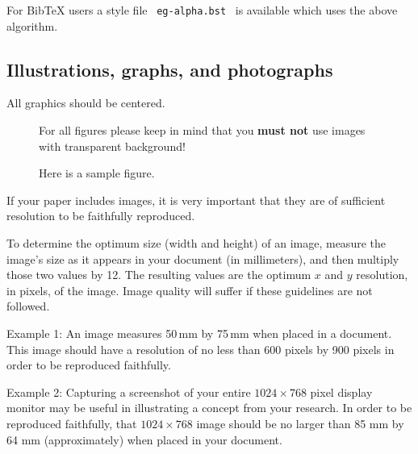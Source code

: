 For BibTeX users a style file \ \texttt{eg-alpha.bst} \ is available which
uses the above algorithm.

\subsection{Illustrations, graphs, and photographs}

All graphics should be centered.

\begin{figure}[htb]
  \centering
  \parbox[t]{.9\columnwidth}{\relax
           For all figures please keep in mind that you \textbf{must not}
           use images with transparent background!
           }
  \caption{\label{fig:firstExample}
           Here is a sample figure.}
\end{figure}

If your paper includes images, it is very important that they are of
sufficient resolution to be faithfully reproduced.

To determine the optimum size (width and height) of an image, measure
the image's size as it appears in your document (in millimeters), and
then multiply those two values by 12. The resulting values are the
optimum $x$ and $y$ resolution, in pixels, of the image. Image quality
will suffer if these guidelines are not followed.

Example 1:
%
An image measures 50\,mm by 75\,mm when placed in a document. This
image should have a resolution of no less than 600 pixels by 900
pixels in order to be reproduced faithfully.

Example 2:
%
Capturing a screenshot of your entire $1024 \times 768$ pixel display
monitor may be useful in illustrating a concept from your research. In
order to be reproduced faithfully, that $1024 \times 768$ image should
be no larger than 85 mm by 64 mm (approximately) when placed in your
document.


